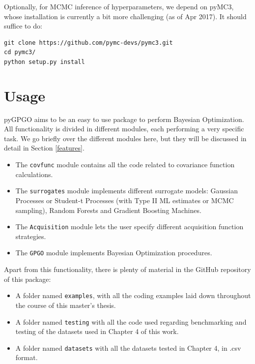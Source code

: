 \documentclass[10pt,a4paper,twoside]{book}
\begin{document}
Optionally, for MCMC inference of hyperparameters, we depend on pyMC3, whose installation is currently a bit more challenging (as of Apr 2017). It should suffice to do:

\begin{verbatim}
git clone https://github.com/pymc-devs/pymc3.git
cd pymc3/
python setup.py install               
\end{verbatim}

 
\section{Usage}

pyGPGO aims to be an easy to use package to perform Bayesian Optimization. All functionality is divided in different modules, each performing a very specific task. We go briefly over the different modules here, but they will be discussed in detail in Section \ref{features}.

\begin{itemize}
\item The \texttt{covfunc} module contains all the code related to covariance function calculations. 
\item The \texttt{surrogates} module implements different surrogate models: Gaussian Processes or Student-t Processes (with Type II ML estimates or MCMC sampling), Random Forests and Gradient Boosting Machines.
\item The \texttt{Acquisition} module lets the user specify different acquisition function strategies.
\item The \texttt{GPGO} module implements Bayesian Optimization procedures. 
\end{itemize}

Apart from this functionality, there is plenty of material in the GitHub repository of this package:

\begin{itemize}
\item A folder named \texttt{examples}, with all the coding examples laid down throughout the course of this master's thesis.
\item A folder named \texttt{testing} with all the code used regarding benchmarking and testing of the datasets used in Chapter 4 of this work.
\item A folder named \texttt{datasets} with all the datasets tested in Chapter 4, in .csv format. 
\end{itemize}
\end{document}
